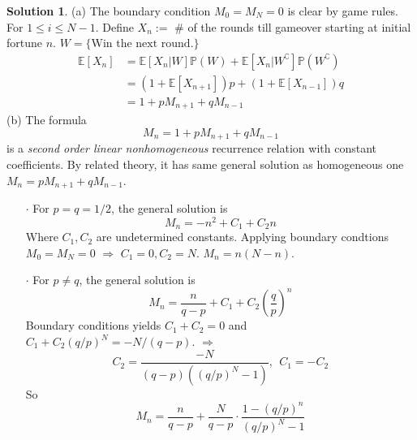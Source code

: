 \documentclass[a4paper, 10pt]{article}
\theoremstyle{definition}
\theoremstyle{hSol}
\newtheorem*{solution}{Solution}
\begin{document}
\begin{solution} (a) The boundary condition $M_0=M_N=0$ is clear by game rules. For $1\leq i\leq N-1$. Define $X_n:=$ \# of the rounds till gameover starting at initial fortune $n$. $W=\{\text{Win the next round.}\}$
\begin{equation}
  \begin{split}
    \mathbb{E}\left[X_n\right] &= \mathbb{E}\left[X_n|W\right]\mathbb{P}\left(W\right)+ \mathbb{E}[X_n|W^{\complement}]\mathbb{P}(W^{\complement}) \\
    &= (1+\mathbb{E}\left[X_{n+1}\right])p+(1+\mathbb{E}\left[X_{n-1}\right])q\\
    &= 1+pM_{n+1}+qM_{n-1}
  \end{split}
\end{equation}
(b) The formula
\begin{equation}
  M_n = 1+pM_{n+1}+qM_{n-1}
\end{equation}
is a \textit{second order linear nonhomogeneous} recurrence relation with constant coefficients. By related theory, it has same general solution as homogeneous one $M_n=pM_{n+1}+qM_{n-1}$. 
\begin{itemize}
  \item[$\cdot$] For $p=q=1/2$, the general solution is
  \begin{equation}
    M_n = -n^2 + C_1 + C_2 n
  \end{equation}
  Where $C_1,C_2$ are undetermined constants. Applying boundary condtions $M_0=M_N=0$ $\Rightarrow$ $C_1=0, C_2=N$. $M_n=n(N-n)$.
  \item[$\cdot$] For $p\ne q$, the general solution is
  \begin{equation}
    M_n = \frac{n}{q-p} + C_1 + C_2 \left(\frac{q}{p}\right)^n
  \end{equation}
  Boundary conditions yields $C_1+C_2=0$ and $C_1+C_2(q/p)^N=-N/(q-p)$. $\Rightarrow$ 
  \begin{equation}
    C_2 = \frac{-N}{(q-p)((q/p)^N-1)},~~C_1=-C_2
  \end{equation}
  So
  \begin{equation}
    M_n = \frac{n}{q-p} + \frac{N}{q-p}\cdot\frac{1-(q/p)^n}{(q/p)^N-1}
  \end{equation}
\end{itemize}
\end{solution}
\end{document}
